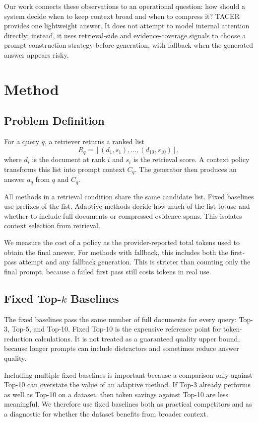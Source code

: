 \documentclass[11pt]{article}
\begin{document}
Our work connects these observations to an operational question: how should a system decide when to keep context broad and when to compress it? TACER provides one lightweight answer. It does not attempt to model internal attention directly; instead, it uses retrieval-side and evidence-coverage signals to choose a prompt construction strategy before generation, with fallback when the generated answer appears risky.

\section{Method}

\subsection{Problem Definition}

For a query $q$, a retriever returns a ranked list
\[
R_q = [(d_1,s_1), \ldots, (d_{10},s_{10})],
\]
where $d_i$ is the document at rank $i$ and $s_i$ is the retrieval score. A context policy transforms this list into prompt context $C_q$. The generator then produces an answer $a_q$ from $q$ and $C_q$.

All methods in a retrieval condition share the same candidate list. Fixed baselines use prefixes of the list. Adaptive methods decide how much of the list to use and whether to include full documents or compressed evidence spans. This isolates context selection from retrieval.

We measure the cost of a policy as the provider-reported total tokens used to obtain the final answer. For methods with fallback, this includes both the first-pass attempt and any fallback generation. This is stricter than counting only the final prompt, because a failed first pass still costs tokens in real use.

\subsection{Fixed Top-$k$ Baselines}

The fixed baselines pass the same number of full documents for every query: Top-3, Top-5, and Top-10. Fixed Top-10 is the expensive reference point for token-reduction calculations. It is not treated as a guaranteed quality upper bound, because longer prompts can include distractors and sometimes reduce answer quality.

Including multiple fixed baselines is important because a comparison only against Top-10 can overstate the value of an adaptive method. If Top-3 already performs as well as Top-10 on a dataset, then token savings against Top-10 are less meaningful. We therefore use fixed baselines both as practical competitors and as a diagnostic for whether the dataset benefits from broader context.
\end{document}

